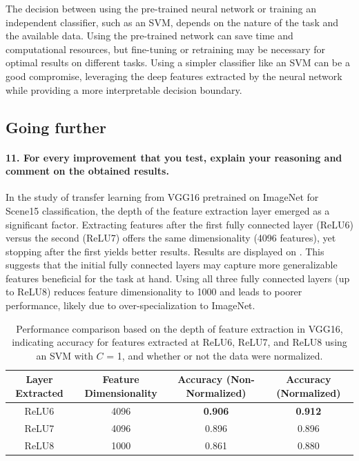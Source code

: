 The decision between using the pre-trained neural network or training an independent classifier, such as an SVM, depends on the nature of the task and the available data. Using the pre-trained network can save time and computational resources, but fine-tuning or retraining may be necessary for optimal results on different tasks. Using a simpler classifier like an SVM can be a good compromise, leveraging the deep features extracted by the neural network while providing a more interpretable decision boundary.

\subsection{Going further}
\paragraph*{11. For every improvement that you test, explain your reasoning and comment on the obtained results.}

In the study of transfer learning from VGG16 pretrained on ImageNet for Scene15 classification, the depth of the feature extraction layer emerged as a significant factor. Extracting features after the first fully connected layer (ReLU6) versus the second (ReLU7) offers the same dimensionality (4096 features), yet stopping after the first yields better results. Results are displayed on . This suggests that the initial fully connected layers may capture more generalizable features beneficial for the task at hand. Using all three fully connected layers (up to ReLU8) reduces feature dimensionality to 1000 and leads to poorer performance, likely due to over-specialization to ImageNet.

\begin{table}[H]
    \centering
    \begin{tabular}{@{}cccc@{}}
        \toprule
        \textbf{Layer Extracted} & \textbf{Feature Dimensionality} & \textbf{Accuracy (Non-Normalized)} & \textbf{Accuracy (Normalized)} \\
        \midrule \midrule
        ReLU6                    & 4096                            & \textbf{0.906}                     & \textbf{0.912}                 \\
        ReLU7                    & 4096                            & 0.896                              & 0.896                          \\
        ReLU8                    & 1000                            & 0.861                              & 0.880                          \\
        \bottomrule
    \end{tabular}
    \caption{Performance comparison based on the depth of feature extraction in VGG16, indicating accuracy for features extracted at ReLU6, ReLU7, and ReLU8 using an SVM with $C$ = 1, and whether or not the data were normalized.}
    \label{tab:depth_influence}
\end{table}

